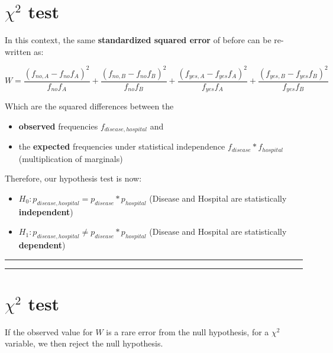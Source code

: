 \documentclass[
]{book}
\providecommand{\tightlist}{%
  \setlength{\itemsep}{0pt}\setlength{\parskip}{0pt}}
\begin{document}
\hypertarget{chi2-test-2}{%
\section{\texorpdfstring{\(\chi^2\) test}{\textbackslash chi\^{}2 test}}\label{chi2-test-2}}

In this context, the same \textbf{standardized squared error} of before can be re-written as:

\[W= \frac{(f_{no,A}-f_{no}f_{A})^2}{f_{no}f_{A}}+\frac{(f_{no,B}-f_{no}f_{B})^2}{f_{no}f_{B}}+\frac{(f_{yes,A}-f_{yes}f_{A})^2}{f_{yes}f_{A}}+\frac{(f_{yes,B}-f_{yes}f_{B})^2}{f_{yes}f_{B}}\]

Which are the squared differences between the

\begin{itemize}
\tightlist
\item
  \textbf{observed} frequencies \(f_{disease, hospital}\) and
\item
  the \textbf{expected} frequencies under statistical independence \(f_{disease}*f_{hospital}\) (multiplication of marginals)
\end{itemize}

Therefore, our hypothesis test is now:

\begin{itemize}
\tightlist
\item
  \(H_0:p_{disease, hospital}=p_{disease}*p_{hospital}\) (Disease and Hospital are statistically \textbf{independent})
\item
  \(H_1:p_{disease, hospital}\neq p_{disease}*p_{hospital}\)
  (Disease and Hospital are statistically \textbf{dependent})
\end{itemize}

\begin{center}\rule{0.5\linewidth}{0.5pt}\end{center}

\begin{center}\rule{0.5\linewidth}{0.5pt}\end{center}

\hypertarget{chi2-test-3}{%
\section{\texorpdfstring{\(\chi^2\) test}{\textbackslash chi\^{}2 test}}\label{chi2-test-3}}

If the observed value for \(W\) is a rare error from the null hypothesis, for a \(\chi^2\) variable, we then reject the null hypothesis.
\end{document}
